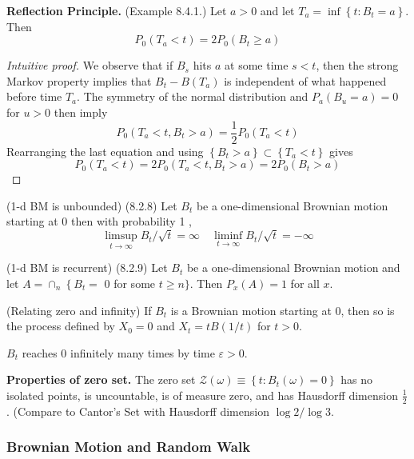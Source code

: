 \textbf{Reflection Principle.} 
(Example 8.4.1.) Let $a>0$ and let $T_a=\inf \left\{t: B_t=a\right\}$. Then
\[
P_0\left(T_a<t\right)=2 P_0\left(B_t \geq a\right)
\]
\begin{proof}[Intuitive proof]
	
We observe that if $B_s$ hits $a$ at some time $s<t$, then the strong Markov property implies that $B_t-B\left(T_a\right)$ is independent of what happened before time $T_a$. The symmetry of the normal distribution and $P_a\left(B_u=a\right)=0$ for $u>0$ then imply
\[
P_0\left(T_a<t, B_t>a\right)=\frac{1}{2} P_0\left(T_a<t\right)
\]
Rearranging the last equation and using $\left\{B_t>a\right\} \subset\left\{T_a<t\right\}$ gives
\[
P_0\left(T_a<t\right)=2 P_0\left(T_a<t, B_t>a\right)=2 P_0\left(B_t>a\right)
\]
\end{proof}

\begin{theorem}(1-d BM is unbounded)
	(8.2.8) Let $B_t$ be a one-dimensional Brownian motion starting at 0 then with probability 1 ,
\[
\limsup _{t \rightarrow \infty} B_t / \sqrt{t}=\infty \quad \liminf _{t \rightarrow \infty} B_t / \sqrt{t}=-\infty
\]
\end{theorem}

\begin{theorem}(1-d BM is recurrent)
(8.2.9) Let $B_t$ be a one-dimensional Brownian motion and let $A=\cap_n\left\{B_t=\right.$ 0 for some $t \geq n\}$. Then $P_x(A)=1$ for all $x$.
\end{theorem}

\begin{theorem}
	(Relating zero and infinity) If $B_t$ is a Brownian motion starting at 0, then so is the process defined by $X_0=0$ and $X_t=t B(1 / t)$ for $t>0$.
\end{theorem}

\begin{corollary}
	$B_t$ reaches $0$ infinitely many times by time $ \varepsilon>0$.
\end{corollary}

\textbf{Properties of zero set.} The zero set $\mathcal{Z}(\omega) \equiv\left\{t: B_t(\omega)=0\right\}$ has no isolated points, is uncountable, is of measure zero, and has Hausdorff dimension $\frac{1}{2}$. (Compare to Cantor's Set with Hausdorff dimension $\log 2 / \log 3$.

\subsubsection{Brownian Motion and Random Walk}

